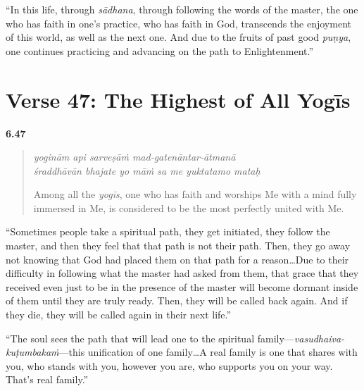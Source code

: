\enquote{In this life, through \textit{sādhana}, through following the words of the master, the one who has faith in one’s practice, who has faith in God, transcends the enjoyment of this world, as well as the next one. And due to the fruits of past good \textit{puṇya}, one continues practicing and advancing on the path to Enlightenment.}

\section{Verse 47: The Highest of All Yogīs}\label{sec-verse-47-the-highest-of-all-yogis}

\par\noindent\textbf{6.47}\par
\begin{verse}
\textit{yoginām api sarveṣāṁ mad-gatenāntar-ātmanā} \\
\textit{śraddhāvān bhajate yo māṁ sa me yuktatamo mataḥ}

\noindent Among all the \textit{yogīs}, one who has faith and worships Me with a mind fully immersed in Me, is considered to be the most perfectly united with Me.
\end{verse}
\par


\enquote{Sometimes people take a spiritual path, they get initiated, they follow the master, and then they feel that that path is not their path. Then, they go away not knowing that God had placed them on that path for a reason\ldots Due to their difficulty in following what the master had asked from them, that grace that they received even just to be in the presence of the master will become dormant inside of them until they are truly ready. Then, they will be called back again. And if they die, they will be called again in their next life.}

\enquote{The soul sees the path that will lead one to the spiritual family---\textit{vasudhaiva-kuṭumbakaṁ}---this unification of one family\ldots A real family is one that shares with you, who stands with you, however you are, who supports you on your way. That’s real family.}
